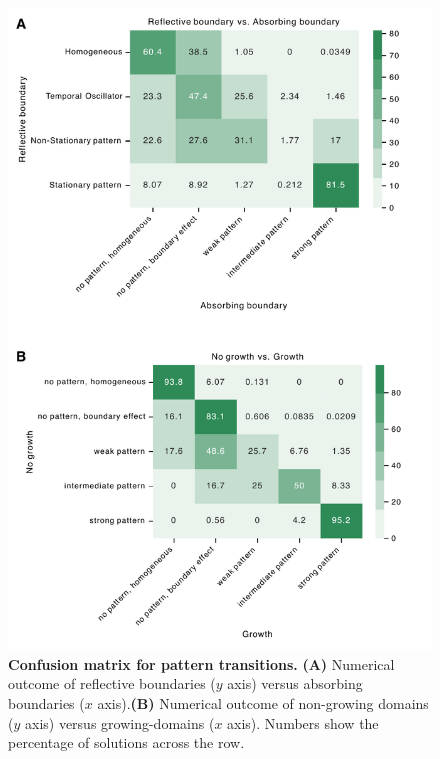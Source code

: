 \documentclass[10pt,letterpaper]{article}
\begin{document}
\begin{figure}[!h]
    \includegraphics[width=1\textwidth]{figures/sup_confusion_matrix}

    \caption{{\bf Confusion matrix for pattern transitions.} \textbf{(A)} Numerical outcome of reflective boundaries ($y$ axis) versus absorbing boundaries ($x$ axis).\textbf{(B)} Numerical outcome of non-growing domains ($y$ axis) versus growing-domains ($x$ axis). Numbers show the percentage of solutions across the row.}

    \label{sup_fig5}
\end{figure}
\end{document}
